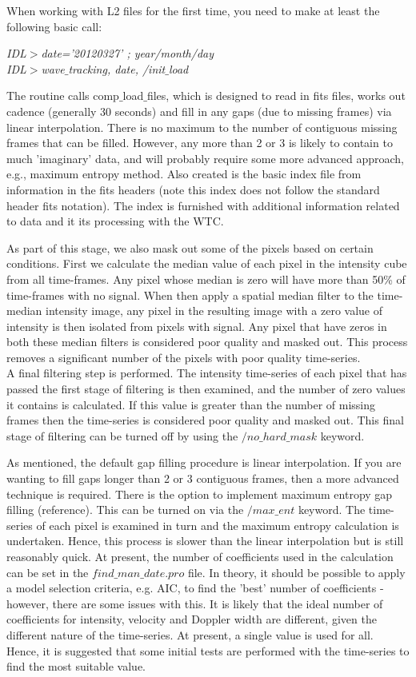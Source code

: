 \documentclass{article}
\begin{document}
\medskip
When working with L2 files for the first time, you need to make at least the following basic call: 

\medskip
\textit{IDL$>$date='20120327' ; year/month/day\\
IDL$>$wave$\_$tracking, date, /init$\_$load
}

\medskip
The routine calls comp$\_$load$\_$files, which is designed to read in fits files, works out cadence (generally 30 seconds) 
and fill in any gaps (due to missing frames) via linear interpolation. There is no maximum to the number of contiguous missing frames that can be filled. However, any more than 2 or 3 is likely to contain to much 'imaginary' data, and will probably require some more advanced approach, e.g., maximum entropy method. Also created is the basic index file from information in the fits headers (note this index does not follow the standard header fits notation). The index is furnished with additional information related to data and it
its processing with the WTC.

\medskip
As part of this stage, we also mask out some of the pixels based on certain conditions. First we calculate the median value of
each pixel in the intensity cube from all time-frames. Any pixel whose median is zero will have more than 50\% of time-frames with no signal. When then apply a spatial median filter to the time-median intensity image, any pixel in the resulting image with a zero value of intensity is then isolated from pixels with signal. Any pixel that have zeros in both these median filters is considered poor 
quality and masked out. This process removes a significant number of the pixels with poor quality time-series.\\
A final filtering step is performed. The intensity time-series of each pixel that has passed the first stage of filtering is then 
examined, and the number of zero values it contains is calculated. If this value is greater than the number of missing frames then
the time-series is considered poor quality and masked out. This final stage of filtering can be turned off by using the 
$/no\_hard\_mask$ keyword.

\medskip
As mentioned, the default gap filling procedure is linear interpolation. If you are wanting to fill gaps longer than 2 or 3 contiguous
frames, then a more advanced technique is required. There is the option to implement maximum entropy gap filling (reference). This can
be turned on via the $/max\_ent$ keyword. The time-series of each pixel is examined in turn and the maximum entropy calculation is undertaken. Hence, this process is slower than the linear interpolation but is still reasonably quick. At present, the number of coefficients used in the calculation can be set in the $find\_man\_date.pro$ file. In theory, it should be possible to apply a model
selection criteria, e.g. AIC, to find the 'best' number of coefficients - however, there are some issues with this. It is likely that
the ideal number of coefficients for intensity, velocity and Doppler width are different, given the different nature of the time-series.
At present, a single value is used for all. Hence, it is suggested that some initial tests are performed with the time-series to find
the most suitable value.
\end{document}
